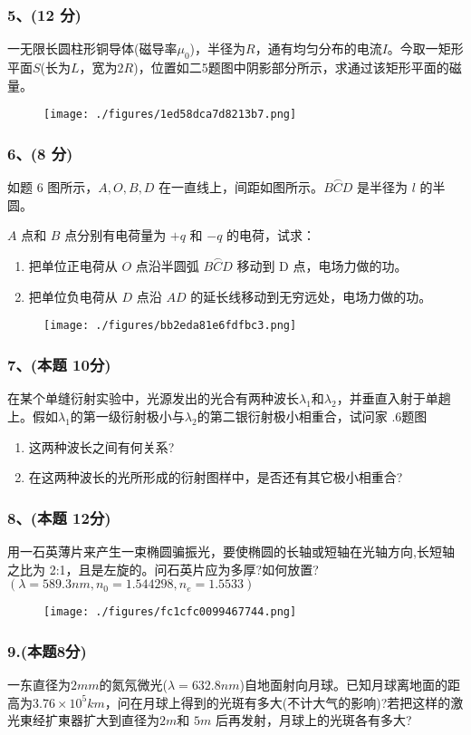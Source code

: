 \subsubsection{5、(12 分)}
一无限长圆柱形铜导体(磁导率$\mu_0$)，半径为$R$，通有均匀分布的电流$I$。今取一矩形平面$S$(长为$L$，宽为$2R$)，位置如二5题图中阴影部分所示，求通过该矩形平面的磁量。
\begin{figure}[ht]
\centering
\texttt{[image: ./figures/1ed58dca7d8213b7.png]}
\caption{} \label{fig_CD13_5}
\end{figure}
\subsubsection{6、(8 分)}
如题 6 图所示，$A,O,B,D$ 在一直线上，间距如图所示。$ \overset{\frown}{BCD} $ 是半径为 $l$ 的半圆。

$A$ 点和 $B$ 点分别有电荷量为 $+q$ 和 $-q$ 的电荷，试求：
\begin{enumerate}
\item 把单位正电荷从 $O$ 点沿半圆弧 $\overset{\frown}{BCD}$ 移动到 D 点，电场力做的功。
\item 把单位负电荷从 $D$ 点沿 $AD$ 的延长线移动到无穷远处，电场力做的功。
\end{enumerate}
\begin{figure}[ht]
\centering
\texttt{[image: ./figures/bb2eda81e6fdfbc3.png]}
\caption{} \label{fig_CD13_6}
\end{figure}
\subsubsection{7、(本题 10分)}
在某个单缝衍射实验中，光源发出的光合有两种波长$\lambda_1$和$\lambda_2$，并垂直入射于单趟上。假如$\lambda_1$的第一级衍射极小与$\lambda_2$的第二银衍射极小相重合，试问家
.6题图
\begin{enumerate}
\item 这两种波长之间有何关系?
\item 在这两种波长的光所形成的衍射图样中，是否还有其它极小相重合?
\end{enumerate}
\subsubsection{8、(本题 12分)}
用一石英薄片来产生一束椭圆骗振光，要使椭圆的长轴或短轴在光轴方向,长短轴之比为 2:1，且是左旋的。问石英片应为多厚?如何放置?$(\lambda=589.3nm,n_0=1.544298,n_e=1.5533)$
\begin{figure}[ht]
\centering
\texttt{[image: ./figures/fc1cfc0099467744.png]}
\caption{} \label{fig_CD13_7}
\end{figure}
\subsubsection{9.(本题8分)}
一东直径为$2mm$的氮氖微光($\lambda=632.8nm$)自地面射向月球。已知月球离地面的距高为$3.76\times10^5km$，问在月球上得到的光斑有多大(不计大气的影响)?若把这样的激光東经扩東器扩大到直径为$2m$和 $5m$ 后再发射，月球上的光斑各有多大?